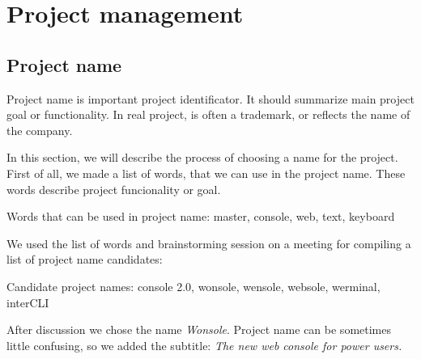 \chapter{Project management}

\section{Project name}
Project name is important project identificator. It should summarize main project goal or functionality. In real project, is often a trademark, or reflects the name of the company.

In this section, we will describe the process of choosing a name for the project. First of all, we made a list of words, that we can use in the project name. These words describe project funcionality or goal.

Words that can be used in project name: master, console, web, text, keyboard

We used the list of words and brainstorming session on a meeting for compiling a list of project name candidates:

Candidate project names: console 2.0, wonsole, wensole, websole, werminal, interCLI

After discussion we chose the name \emph{Wonsole}. Project name can be sometimes little confusing, so we added the subtitle: \emph{The new web console for power users.}

